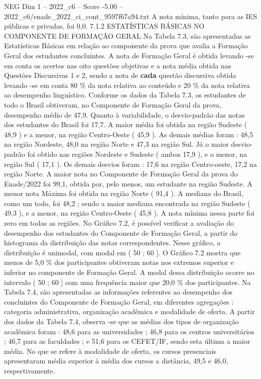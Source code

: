 \begin{textsample}{NEG Dim 1 – 2022\_c6 – Score -5.00 – 2022\_c6/enade\_2022\_ci\_cont\_9597f67a94.txt}
A nota mínima, tanto para as IES públicas e privadas, foi 0,0. 7.1.2 ESTATÍSTICAS BÁSICAS NO COMPONENTE DE FORMAÇÃO GERAL Na Tabela 7.3, são apresentadas as Estatísticas Básicas em relação ao componente da prova que avalia a Formação Geral dos estudantes concluintes.
A nota de Formação Geral é obtida levando -se em conta os acertos nas oito questões objetivas e a nota média obtida nas Questões Discursivas 1 e 2, sendo a nota de \textbf{cada} questão discursiva obtida levando -se em conta 80 \% da nota relativa ao conteúdo e 20 \% da nota relativa ao desempenho linguístico.
Conforme os dados da Tabela 7.3, os estudantes de todo o Brasil obtiveram, no Componente de Formação Geral da prova, desempenho médio de 47,9.
Quanto à variabilidade, o desvio-padrão das notas dos estudantes do Brasil foi 17,7.
A maior média foi obtida na região Sudeste ( 48,9 ) e a menor, na região Centro-Oeste ( 45,9 ).
As demais médias foram : 48,5 na região Nordeste, 48,0 na região Norte e 47,3 na região Sul.
Já o maior desvio-padrão foi obtido nas regiões Nordeste e Sudeste ( ambos 17,9 ), e o menor, na região Sul ( 17,1 ).
Os demais desvios foram : 17,6 na região Centro-oeste, 17,2 na região Norte.
A maior nota no Componente de Formação Geral da prova do Enade/2022 foi 99,1, obtida por, pelo menos, um estudante na região Sudeste.
A menor nota Máxima foi obtida na região Norte ( 91,4 ).
A mediana do Brasil, como um todo, foi 48,2 ; sendo a maior mediana encontrada na região Sudeste ( 49,3 ), e a menor, na região Centro-Oeste ( 45,8 ).
A nota mínima nessa parte foi zero em todas as regiões.
No Gráfico 7.2, é possível verificar a avaliação do desempenho dos estudantes do Componente de Formação Geral, a partir do histograma da distribuição das notas correspondentes.
Nesse gráfico, a distribuição é unimodal, com modal em ( 50 ; 60 ].
O Gráfico 7.2 mostra que menos de 5,0 \% dos participantes obtiveram notas nos extremos superior e inferior no componente de Formação Geral.
A modal dessa distribuição ocorre no intervalo ( 50 ; 60 ] com uma frequência maior que 20,0 \% dos participantes.
Na Tabela 7.4, são apresentadas as informações referentes ao desempenho dos concluintes do Componente de Formação Geral, em diferentes agregações : categoria administrativa, organização acadêmica e modalidade de oferta.
A partir dos dados da Tabela 7.4, observa -se que as médias dos tipos de organização acadêmica foram : 48,6 para as universidades ; 46,8 para os centros universitários ; 46,7 para as faculdades ; e 51,6 para os CEFET/IF, sendo esta última a maior média.
No que se refere à modalidade de oferta, os cursos presenciais apresentaram média superior à média dos cursos a distância, 49,5 e 46,0, respectivamente.

\end{textsample}

